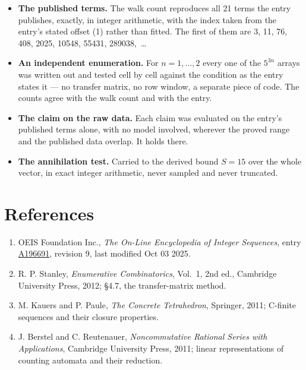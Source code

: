 \documentclass[11pt]{article}
\theoremstyle{definition}
\begin{document}
\begin{itemize}

\item {\bfseries The published terms.} The walk count reproduces all 21 terms the entry publishes, exactly, in integer arithmetic, with the index taken from the entry's stated offset (1) rather than fitted. The first of them are 3, 11, 76, 408, 2025, 10548, 55431, 289038,~\dots

\item {\bfseries An independent enumeration.} For $n = 1,\dots,2$ every one of the $5^{3n}$ arrays was written out and tested cell by cell against the condition as the entry states it --- no transfer matrix, no row window, a separate piece of code. The counts agree with the walk count and with the entry.

\item {\bfseries The claim on the raw data.} Each claim was evaluated on the entry's published terms alone, with no model involved, wherever the proved range and the published data overlap. It holds there.

\item {\bfseries The annihilation test.} Carried to the derived bound $S = 15$ over the whole vector, in exact integer arithmetic, never sampled and never truncated.

\end{itemize}

\section{References}

\begin{enumerate}

\item OEIS Foundation Inc., \emph{The On-Line Encyclopedia of Integer Sequences}, entry \href{https://oeis.org/A196691}{A196691}, revision 9, last modified Oct 03 2025.

\item R. P. Stanley, \emph{Enumerative Combinatorics}, Vol.~1, 2nd ed., Cambridge University Press, 2012; \S4.7, the transfer-matrix method.

\item M. Kauers and P. Paule, \emph{The Concrete Tetrahedron}, Springer, 2011; C-finite sequences and their closure properties.

\item J. Berstel and C. Reutenauer, \emph{Noncommutative Rational Series with Applications}, Cambridge University Press, 2011; linear representations of counting automata and their reduction.

\end{enumerate}
\end{document}
